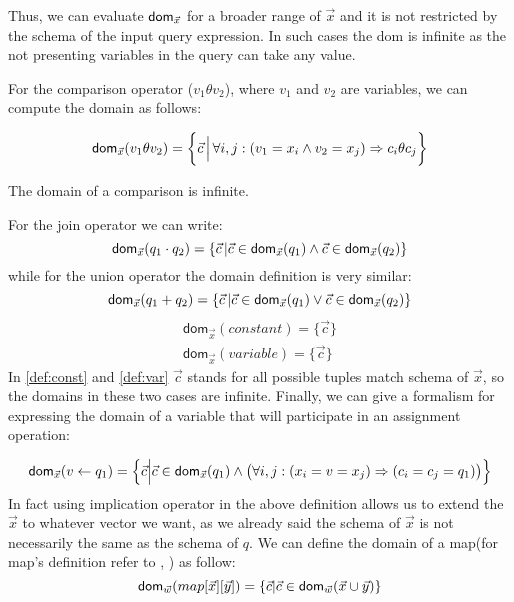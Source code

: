 \documentclass[12pt]{article}
\newcommand{\dom}{\textsf{dom}}
\begin{document}
Thus, we can evaluate $\text{\dom}_{\vec{x}}$ for a broader range of $\vec{x}$ and it is not restricted by the schema of the input query expression. In such cases the \dom{} is infinite as the not presenting variables in the query can take any value.

For the comparison operator ($v_{1}\theta v_{2}$), where $v_1$ and $v_2$ are variables, we can compute the domain as follows:

\begin{equation}
\text{\dom{}}_{\vec{x}}(v_{1}\theta v_{2})=\bigg\{\vec{c}\,\Big|\,\forall i,j:(v_{1}=x_{i}\land v_{2}=x_{j})\Rightarrow c_{i}\theta c_{j}\bigg\}
\end{equation}

The domain of a comparison is infinite.

For the join operator we can write:
\begin{equation}
\label{def:join}
\text{\dom{}}_{\vec{x}}(q_{1}\cdot q_{2})=\{\vec{c}\,|\vec{c}\in\text{\dom{}}_{\vec{x}}(q_{1})\land\vec{c}\in\text{\dom{}}_{\vec{x}}(q_{2})\}
\end{equation}
while for the union operator the domain definition is very similar:
\begin{equation}
\label{def:plus}
\text{\dom{}}_{\vec{x}}(q_{1}+ q_{2})=\{\vec{c}\,|\vec{c}\in\text{\dom{}}_{\vec{x}}(q_{1})\lor\vec{c}\in\text{\dom{}}_{\vec{x}}(q_{2})\}
\end{equation}
\begin{eqnarray}
\dom{}_{\vec x}(constant)=\Big\{\vec c\Big\}\label{def:const}\\
\dom{}_{\vec x}(variable)=\Big\{\vec c\Big\}\label{def:var}
\end{eqnarray}
In \eqref{def:const} and \eqref{def:var}  $\vec{c}$ stands for all possible tuples match schema of $\vec{x}$, so the domains in these two cases are infinite. 
Finally, we can give a formalism for expressing the domain of a variable that will participate in an assignment operation:

\begin{equation}
\label{assign2}
\text{\dom{}}_{\vec{x}}(v\gets q_{1})=\Big\{\vec{c}\Big|\vec{c}\in\text{\dom{}}_{\vec{x}}(q_{1})\land \big(\forall i,j: (x_{i}=v=x_{j})\Rightarrow(c_{i}=c_{j}=q_{1})\big)\Big\}
\end{equation}
In fact using implication operator in the above definition allows us to extend the $\vec{x}$ to whatever vector we want, as we already said the schema of $\vec{x}$ is not necessarily the same as the schema of $q$. %
We can define the domain of a map(for map's definition refer to \cite{1}, \cite{2}) as follow:
\begin{equation}
\label{def:map}
\text{\dom}_{\vec{w}}(map[\vec{x}][\vec{y}])=\{\vec{c}|\vec{c}\in\text{\dom}_{\vec{w}}(\vec{x}\cup\vec{y})\}
\end{equation}
\end{document}
